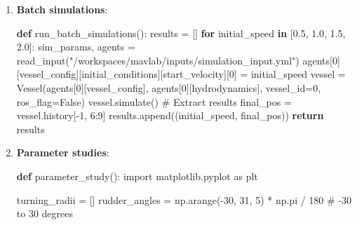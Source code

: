 \documentclass[
  letterpaper,
  DIV=11,
  numbers=noendperiod]{scrreprt}
\newenvironment{Shaded}{\begin{snugshade}}{\end{snugshade}}
\newcommand{\CommentTok}[1]{\textcolor[rgb]{0.37,0.37,0.37}{#1}}
\newcommand{\ControlFlowTok}[1]{\textcolor[rgb]{0.00,0.23,0.31}{\textbf{#1}}}
\newcommand{\DecValTok}[1]{\textcolor[rgb]{0.68,0.00,0.00}{#1}}
\newcommand{\FloatTok}[1]{\textcolor[rgb]{0.68,0.00,0.00}{#1}}
\newcommand{\ImportTok}[1]{\textcolor[rgb]{0.00,0.46,0.62}{#1}}
\newcommand{\KeywordTok}[1]{\textcolor[rgb]{0.00,0.23,0.31}{\textbf{#1}}}
\newcommand{\NormalTok}[1]{\textcolor[rgb]{0.00,0.23,0.31}{#1}}
\newcommand{\OperatorTok}[1]{\textcolor[rgb]{0.37,0.37,0.37}{#1}}
\newcommand{\StringTok}[1]{\textcolor[rgb]{0.13,0.47,0.30}{#1}}
\newcommand{\VariableTok}[1]{\textcolor[rgb]{0.07,0.07,0.07}{#1}}
\begin{document}
\begin{enumerate}
\def\labelenumi{\arabic{enumi}.}
\item
  \textbf{Batch simulations}:

\begin{Shaded}
\begin{Highlighting}[]
\KeywordTok{def}\NormalTok{ run\_batch\_simulations():}
\NormalTok{    results }\OperatorTok{=}\NormalTok{ []}
    \ControlFlowTok{for}\NormalTok{ initial\_speed }\KeywordTok{in}\NormalTok{ [}\FloatTok{0.5}\NormalTok{, }\FloatTok{1.0}\NormalTok{, }\FloatTok{1.5}\NormalTok{, }\FloatTok{2.0}\NormalTok{]:}
\NormalTok{        sim\_params, agents }\OperatorTok{=}\NormalTok{ read\_input(}\StringTok{"/workspaces/mavlab/inputs/simulation\_input.yml"}\NormalTok{)}
\NormalTok{        agents[}\DecValTok{0}\NormalTok{][}\StringTok{\textquotesingle{}vessel\_config\textquotesingle{}}\NormalTok{][}\StringTok{\textquotesingle{}initial\_conditions\textquotesingle{}}\NormalTok{][}\StringTok{\textquotesingle{}start\_velocity\textquotesingle{}}\NormalTok{][}\DecValTok{0}\NormalTok{] }\OperatorTok{=}\NormalTok{ initial\_speed}
\NormalTok{        vessel }\OperatorTok{=}\NormalTok{ Vessel(agents[}\DecValTok{0}\NormalTok{][}\StringTok{\textquotesingle{}vessel\_config\textquotesingle{}}\NormalTok{], agents[}\DecValTok{0}\NormalTok{][}\StringTok{\textquotesingle{}hydrodynamics\textquotesingle{}}\NormalTok{], vessel\_id}\OperatorTok{=}\DecValTok{0}\NormalTok{, ros\_flag}\OperatorTok{=}\VariableTok{False}\NormalTok{)}
\NormalTok{        vessel.simulate()}
        \CommentTok{\# Extract results}
\NormalTok{        final\_pos }\OperatorTok{=}\NormalTok{ vessel.history[}\OperatorTok{{-}}\DecValTok{1}\NormalTok{, }\DecValTok{6}\NormalTok{:}\DecValTok{9}\NormalTok{]}
\NormalTok{        results.append((initial\_speed, final\_pos))}
    \ControlFlowTok{return}\NormalTok{ results}
\end{Highlighting}
\end{Shaded}
\item
  \textbf{Parameter studies}:

\begin{Shaded}
\begin{Highlighting}[]
\KeywordTok{def}\NormalTok{ parameter\_study():}
    \ImportTok{import}\NormalTok{ matplotlib.pyplot }\ImportTok{as}\NormalTok{ plt}

\NormalTok{    turning\_radii }\OperatorTok{=}\NormalTok{ []}
\NormalTok{    rudder\_angles }\OperatorTok{=}\NormalTok{ np.arange(}\OperatorTok{{-}}\DecValTok{30}\NormalTok{, }\DecValTok{31}\NormalTok{, }\DecValTok{5}\NormalTok{) }\OperatorTok{*}\NormalTok{ np.pi }\OperatorTok{/} \DecValTok{180}  \CommentTok{\# {-}30 to 30 degrees}


\end{Highlighting}
\end{Shaded}
\end{enumerate}
\end{document}
